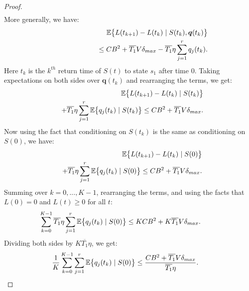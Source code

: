 \documentclass[journal]{IEEEtran}
\newcommand{\expect}[1]{\mathbb{E}\big\{#1\big\}}
\newcommand{\bv}[1]{{\boldsymbol{#1} }}
\begin{document}
\begin{proof}
\begin{eqnarray}
\end{eqnarray}
More generally, we have:
\begin{eqnarray}
\hspace{-.3in}&&\expect{L(t_{k+1})-L(t_k)\left.|\right. S(t_{k}), \bv{q}(t_{k})} \label{eq:drift_backlog_epsilon}\\
\hspace{-.3in}&&  \qquad\qquad\qquad\qquad\leq CB^2 + \overline{T_1}V\delta_{max} - \overline{T_1} \eta\sum_{j=1}^rq_j(t_{k}). \nonumber
\end{eqnarray}
Here $t_k$ is the $k^{th}$ return time of $S(t)$ to state $s_1$ after time $0$. 
Taking expectations on both sides over $\bv{q}(t_k)$ and rearranging the terms, we get:
\begin{eqnarray}
\hspace{-.3in}&&\expect{L(t_{k+1})-L(t_k)\left.|\right. S(t_{k})} \label{eq:drift_backlog_epsilon2}\\
\hspace{-.3in}&&\qquad+ \overline{T_1} \eta\sum_{j=1}^r\expect{q_j(t_{k})\left.|\right. S(t_{k})} \leq CB^2 + \overline{T_1}V\delta_{max}. \nonumber
\end{eqnarray}
Now using the fact that conditioning on $S(t_k)$ is the same as conditioning on $S(0)$, we have:
\begin{eqnarray}
\hspace{-.3in}&&\expect{L(t_{k+1})-L(t_k)\left.|\right. S(0)} \label{eq:drift_backlog_epsilon3}\\
\hspace{-.3in}&&\qquad+ \overline{T_1} \eta\sum_{j=1}^r\expect{q_j(t_{k})\left.|\right. S(0)} \leq CB^2 + \overline{T_1}V\delta_{max}. \nonumber
\end{eqnarray}
Summing over $k=0, ..., K-1$, rearranging the terms, and using the facts that $L(0)=0$ and $L(t)\geq0$ for all $t$:  
\begin{eqnarray}
\hspace{-.5in}&&\sum_{k=0}^{K-1}\overline{T_1} \eta\sum_{j=1}^r\expect{q_j(t_{k})\left.|\right. S(0)} \leq KCB^2 + K\overline{T_1}V\delta_{max}. \label{eq:drift_backlog_epsilon4}
\end{eqnarray}
Dividing both sides by $K\overline{T_1}\eta$, we get:
\begin{eqnarray}
\hspace{-.3in}&&\frac{1}{K}\sum_{k=0}^{K-1}\sum_{j=1}^r\expect{q_j(t_{k})\left.|\right. S(0)} \leq \frac{CB^2 + \overline{T_1}V\delta_{max} }{\overline{T_1} \eta}. \label{eq:drift_backlog_epsilon5}
\end{eqnarray}

\end{proof}
\end{document}
